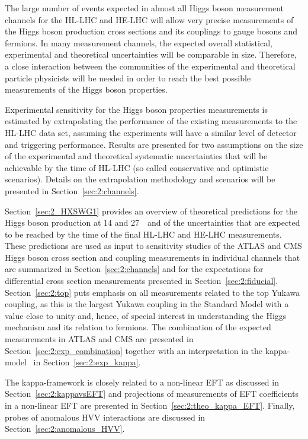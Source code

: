 

The large number of events expected in almost all Higgs boson measurement channels for the HL-LHC and HE-LHC will allow very precise measurements of the Higgs boson production cross sections and its couplings to gauge bosons and fermions. In many measurement channels, the expected overall statistical, experimental and theoretical uncertainties will be comparable in size. Therefore, a close interaction between the communities of the experimental and theoretical particle physicists will be needed in order to reach the best possible measurements of the Higgs boson properties.

Experimental sensitivity for the Higgs boson properties measurements is estimated by extrapolating the performance of the existing measurements to the HL-LHC data set, assuming the experiments will have a similar level of detector and triggering performance. Results are presented for two assumptions on the size of the experimental and theoretical systematic uncertainties that will be achievable by the time of HL-LHC (so called conservative and optimistic scenarios). Details on the extrapolation methodology and scenarios will be presented in Section~\ref{sec:2:channels}.

Section~\ref{sec:2_HXSWG1} provides an overview of theoretical predictions for the Higgs boson production at 14 and 27~\UTeV\ and of the uncertainties that are expected to be reached by the time of the final HL-LHC and HE-LHC measurements. 
These predictions are used as input to sensitivity studies of the ATLAS and CMS Higgs boson cross section and coupling measurements in individual channels that are summarized in Section~\ref{sec:2:channels} and for the expectations for differential cross section measurements presented in Section~\ref{sec:2:fiducial}.
Section~\ref{sec:2:top} puts emphasis on all measurements related to the top Yukawa coupling, as this is the largest Yukawa coupling in the Standard Model with a value close to unity and, hence, of special interest in understanding the Higgs mechanism and its relation to fermions.
The combination of the expected measurements in ATLAS and CMS are presented in Section~\ref{sec:2:exp_combination} together with an interpretation in the kappa-model~\cite{LHCHiggsCrossSectionWorkingGroup:2012nn,Heinemeyer:2013tqa} in Section~\ref{sec:2:exp_kappa}.

The kappa-framework is closely related to a non-linear EFT as discussed in Section~\ref{sec:2:kappavsEFT} and projections of measurements of EFT coefficients in a non-linear EFT are presented in Section~\ref{sec:2:theo_kappa_EFT}. 
Finally, probes of anomalous HVV interactions are discussed in Section~\ref{sec:2:anomalous_HVV}.
